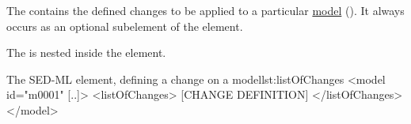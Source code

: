 \label{sec:listOfChanges}
The  contains the defined changes to be applied to a particular \hyperref[class:model]{model} (). 
%
%
It always occurs as an optional subelement of the  element. 

The  is nested inside the  element.
%
\begin{myXmlLst}{The SED-ML  element, defining a change on a model}{lst:listOfChanges}
<model id="m0001" [..]>
 <listOfChanges>
  [CHANGE DEFINITION]
 </listOfChanges>
</model>
\end{myXmlLst}
%


